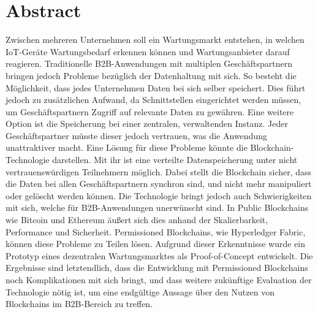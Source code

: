 \pagestyle{empty} %

\chapter*{Abstract} %
\label{cha:abtract}
Zwischen mehreren Unternehmen soll ein Wartungsmarkt entstehen, in welchen IoT-Geräte Wartungsbedarf erkennen können und Wartungsanbieter darauf reagieren. Traditionelle B2B-Anwendungen mit multiplen Geschäftspartnern bringen jedoch Probleme bezüglich der Datenhaltung mit sich. So besteht die Möglichkeit, dass jedes Unternehmen Daten bei sich selber speichert. Dies führt jedoch zu zusätzlichen Aufwand, da Schnittstellen eingerichtet werden müssen, um Geschäftspartnern Zugriff auf relevante Daten zu gewähren. Eine weitere Option ist die Speicherung bei einer zentralen, verwaltenden Instanz. Jeder Geschäftspartner müsste dieser jedoch vertrauen, was die Anwendung unattraktiver macht. Eine Lösung für diese Probleme könnte die Blockchain-Technologie darstellen. Mit ihr ist eine verteilte Datenspeicherung unter nicht vertrauenswürdigen Teilnehmern möglich. Dabei stellt die Blockchain sicher, dass die Daten bei allen Geschäftspartnern synchron sind, und nicht mehr manipuliert oder gelöscht werden können. Die Technologie bringt jedoch auch Schwierigkeiten mit sich, welche für B2B-Anwendungen unerwünscht sind. In Public Blockchains wie Bitcoin und Ethereum äußert sich dies anhand der Skalierbarkeit, Performance und Sicherheit. Permissioned Blockchains, wie Hyperledger Fabric, können diese Probleme zu Teilen lösen. Aufgrund dieser Erkenntnisse wurde ein Prototyp eines dezentralen Wartungsmarktes als Proof-of-Concept entwickelt. Die Ergebnisse sind letztendlich, dass die Entwicklung mit Permissioned Blockchains noch Komplikationen mit sich bringt, und dass weitere zukünftige Evaluation der Technologie nötig ist, um eine endgültige Aussage über den Nutzen von Blockchains im B2B-Bereich zu treffen.
